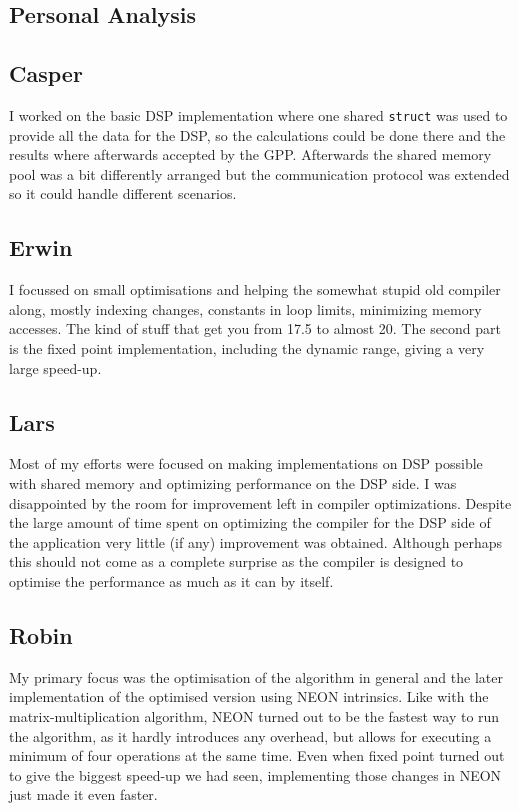 \documentclass[final]{article} %
\begin{document}
\begin{appendices}

\section{Personal Analysis}\label{app:appendix-personal-analysis}

\subsection{Casper}
I worked on the basic DSP implementation where one shared \texttt{struct} was used to provide all the data for the DSP, so the calculations could be done there and the results where afterwards accepted by the GPP.
Afterwards the shared memory pool was a bit differently arranged but the communication protocol was extended so it could handle different scenarios.

\subsection{Erwin}
I focussed on small optimisations and helping the somewhat stupid old compiler along, mostly indexing changes, constants in loop limits, minimizing memory accesses.
The kind of stuff that get you from \SI{17.5}{\speedup} to almost \SI{20}{\speedup}.
The second part is the fixed point implementation, including the dynamic range, giving a very large speed-up.

\subsection{Lars}
Most of my efforts were focused on making implementations on DSP possible with shared memory and optimizing performance on the DSP side.
I was disappointed by the room for improvement left in compiler optimizations.
Despite the large amount of time spent on optimizing the compiler for the DSP side of the application very little (if any) improvement was obtained.
Although perhaps this should not come as a complete surprise as the compiler is designed to optimise the performance as much as it can by itself.

\subsection{Robin}
My primary focus was the optimisation of the algorithm in general and the later implementation of the optimised version using NEON intrinsics.
Like with the matrix-multiplication algorithm, NEON turned out to be the fastest way to run the algorithm, as it hardly introduces any overhead, but allows for executing a minimum of four operations at the same time.
Even when fixed point turned out to give the biggest speed-up we had seen, implementing those changes in NEON just made it even faster.


\end{appendices}
\end{document}
